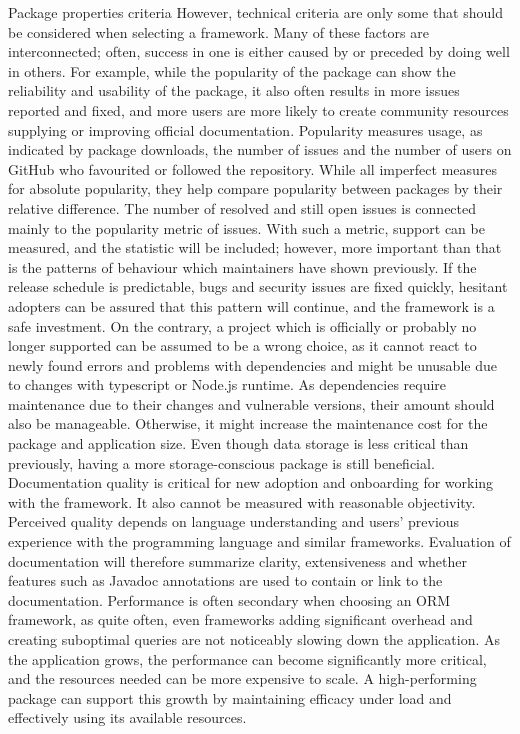 Package properties criteria
However, technical criteria are only some that should be considered when selecting a framework. Many of these factors are interconnected; often, success in one is either caused by or preceded by doing well in others. For example, while the popularity of the package can show the reliability and usability of the package, it also often results in more issues reported and fixed, and more users are more likely to create community resources supplying or improving official documentation.
Popularity measures usage, as indicated by package downloads, the number of issues and the number of users on GitHub who favourited or followed the repository. While all imperfect measures for absolute popularity, they help compare popularity between packages by their relative difference. The number of resolved and still open issues is connected mainly to the popularity metric of issues. With such a metric, support can be measured, and the statistic will be included; however, more important than that is the patterns of behaviour which maintainers have shown previously. If the release schedule is predictable, bugs and security issues are fixed quickly, hesitant adopters can be assured that this pattern will continue, and the framework is a safe investment. On the contrary, a project which is officially or probably no longer supported can be assumed to be a wrong choice, as it cannot react to newly found errors and problems with dependencies and might be unusable due to changes with typescript or Node.js runtime.
As dependencies require maintenance due to their changes and vulnerable versions, their amount should also be manageable. Otherwise, it might increase the maintenance cost for the package and application size. Even though data storage is less critical than previously, having a more storage-conscious package is still beneficial.
Documentation quality is critical for new adoption and onboarding for working with the framework. It also cannot be measured with reasonable objectivity. Perceived quality depends on language understanding and users’ previous experience with the programming language and similar frameworks. Evaluation of documentation will therefore summarize clarity, extensiveness and whether features such as Javadoc annotations are used to contain or link to the documentation.
Performance is often secondary when choosing an ORM framework, as quite often, even frameworks adding significant overhead and creating suboptimal queries are not noticeably slowing down the application. As the application grows, the performance can become significantly more critical, and the resources needed can be more expensive to scale. A high-performing package can support this growth by maintaining efficacy under load and effectively using its available resources.
